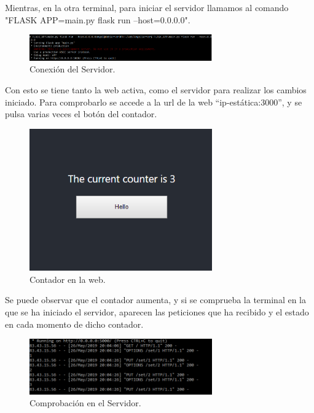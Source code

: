 \documentclass[english,runningheads,a4paper]{llncs}[2018/03/10]
\begin{document}
Mientras, en la otra terminal, para iniciar el servidor llamamos al comando "FLASK APP=main.py flask run –host=0.0.0.0".

\begin{figure}[H]
 \centering
 \includegraphics[width=0.7\textwidth]{./Web/Azure/ConexionServer.png}
 \caption{Conexión del Servidor.}
\end{figure}

Con esto se tiene tanto la web activa, como el servidor para realizar los cambios
iniciado. Para comprobarlo se accede a la url de la web “ip-estática:3000”, y se
pulsa varias veces el botón del contador.

\begin{figure}[H]
 \centering
 \includegraphics[width=0.7\textwidth]{./Web/Azure/Contador.png}
 \caption{Contador en la web.}
\end{figure}

Se puede observar que el contador aumenta, y si se comprueba la terminal en la que
se ha iniciado el servidor, aparecen las peticiones que ha recibido y el estado en
cada momento de dicho contador.

\begin{figure}[H]
 \centering 
 \includegraphics[width=0.7\textwidth]{./Web/Azure/Comprobacion.png}
 \caption{Comprobación en el Servidor.}
\end{figure}
\end{document}

